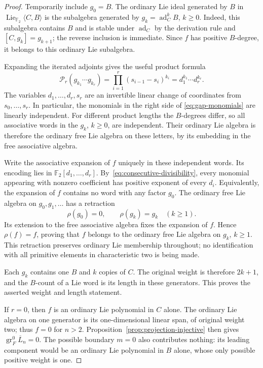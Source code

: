 \documentclass[11pt]{article}
\newcommand{\F}{{\mathbb F_2}}
\newcommand{\Lie}{\operatorname{Lie}}
\DeclareMathOperator{\ad}{ad}
\theoremstyle{definition}
\theoremstyle{remark}
\numberwithin{equation}{section}
\begin{document}
\begin{proof}
Temporarily include $g_0=B$.
The ordinary Lie ideal generated by $B$ in
$\Lie_{\F}\langle C,B\rangle$ is the subalgebra generated by
$g_k=\ad_C^kB$, $k\geq0$.
Indeed, this subalgebra contains $B$ and is stable under $\ad_C$
by the derivation rule and $[C,g_k]=g_{k+1}$; the reverse inclusion
is immediate.  Since $f$ has positive $B$-degree, it belongs to
this ordinary Lie subalgebra.

Expanding the iterated adjoints gives the useful product formula
\begin{equation}
 \label{eq:gap-monomials}
 \mathcal P_r(g_{k_1}\cdots g_{k_r})
 =\prod_{i=1}^r(s_{i-1}-s_i)^{k_i}
 =d_1^{k_1}\cdots d_r^{k_r}.
\end{equation}
The variables $d_1,\ldots,d_r,s_r$ are an invertible linear
change of coordinates from $s_0,\ldots,s_r$.
In particular, the monomials in the right side of
\eqref{eq:gap-monomials} are linearly independent.
For different product lengths the $B$-degrees differ, so all
associative words in the $g_k$, $k\geq0$, are independent.
Their ordinary Lie algebra is therefore the ordinary free Lie
algebra on these letters, by its embedding in the free associative
algebra.

Write the associative expansion of $f$ uniquely in these independent
words.  Its encoding lies in $\F[d_1,\ldots,d_r]$.
By~\eqref{eq:consecutive-divisibility}, every monomial appearing
with nonzero coefficient has positive exponent of every $d_i$.
Equivalently, the expansion of $f$ contains no word with any factor
$g_0$.  The ordinary free Lie algebra on $g_0,g_1,\ldots$ has a
retraction
\[
 \rho(g_0)=0,\qquad \rho(g_k)=g_k\quad(k\geq1).
\]
Its extension to the free associative algebra fixes the expansion
of $f$.  Hence $\rho(f)=f$, proving that $f$ belongs to the
ordinary free Lie algebra on $g_k$, $k\geq1$.
This retraction preserves ordinary Lie membership throughout;
no identification with all primitive elements in characteristic
two is being made.

Each $g_k$ contains one $B$ and $k$ copies of $C$.
The original weight is therefore $2k+1$, and the $B$-count of a
Lie word is its length in these generators.  This proves the
asserted weight and length statement.

If $r=0$, then $f$ is an ordinary Lie polynomial in $C$ alone.
The ordinary Lie algebra on one generator is its one-dimensional
linear span, of original weight two; thus $f=0$ for $n>2$.
Proposition~\ref{prop:projection-injective} then gives
$\operatorname{gr}^0_F\overline L_n=0$.
The possible boundary $m=0$ also contributes nothing: its leading
component would be an ordinary Lie polynomial in $B$ alone,
whose only possible positive weight is one.
\end{proof}
\end{document}
